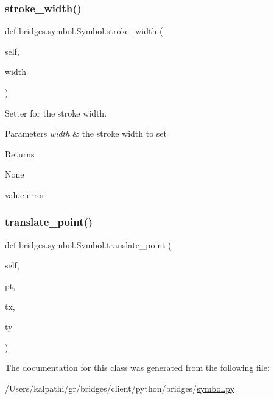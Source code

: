 \subsubsection{\texorpdfstring{stroke\+\_\+width()}{stroke\_width()}\hspace{0.1cm}{\footnotesize\ttfamily [2/2]}}
{\footnotesize\ttfamily def bridges.\+symbol.\+Symbol.\+stroke\+\_\+width (\begin{DoxyParamCaption}\item[{}]{self,  }\item[{}]{width }\end{DoxyParamCaption})}



Setter for the stroke width. 


\begin{DoxyParams}{Parameters}
{\em width} & the stroke width to set \\
\hline
\end{DoxyParams}
\begin{DoxyReturn}{Returns}


None \begin{DoxyVerb}       value error\end{DoxyVerb}
 
\end{DoxyReturn}
\mbox{\label{classbridges_1_1symbol_1_1_symbol_a9600a66f48ad38baf42a2043db13334b}} 
\subsubsection{\texorpdfstring{translate\+\_\+point()}{translate\_point()}}
{\footnotesize\ttfamily def bridges.\+symbol.\+Symbol.\+translate\+\_\+point (\begin{DoxyParamCaption}\item[{}]{self,  }\item[{}]{pt,  }\item[{}]{tx,  }\item[{}]{ty }\end{DoxyParamCaption})}



The documentation for this class was generated from the following file\+:\begin{DoxyCompactItemize}
\item 
/\+Users/kalpathi/gr/bridges/client/python/bridges/\mbox{\hyperlink{symbol_8py}{symbol.\+py}}\end{DoxyCompactItemize}
